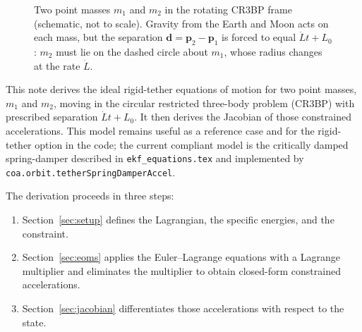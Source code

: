 \documentclass[]{article}
\begin{document}
\begin{figure}[htbp]
\caption{Two point masses $m_1$ and $m_2$ in the rotating CR3BP frame (schematic, not
to scale). Gravity from the Earth and Moon acts on each mass, but the separation
$\mathbf{d} = \mathbf{p}_2 - \mathbf{p}_1$ is forced to equal $\dot{L}t + L_0$: $m_2$ must lie on the dashed
circle about $m_1$, whose radius changes at the rate $\dot{L}$.}
\label{fig:setup}
\end{figure}

This note derives the ideal rigid-tether equations of motion for two point
masses, $m_1$ and $m_2$, moving in the circular restricted three-body problem
(CR3BP) with prescribed separation $\dot{L}t+L_0$. It then derives the
Jacobian of those constrained accelerations. This model remains useful as a
reference case and for the rigid-tether option in the code; the current
compliant model is the critically damped spring-damper described in
\texttt{ekf\_equations.tex} and implemented by
\texttt{coa.orbit.tetherSpringDamperAccel}.

The derivation proceeds in three steps:
\begin{enumerate}
    \item Section~\ref{sec:setup} defines the Lagrangian, the specific energies, and the constraint.
    \item Section~\ref{sec:eoms} applies the Euler--Lagrange equations with a Lagrange multiplier and eliminates the multiplier to obtain closed-form constrained accelerations.
    \item Section~\ref{sec:jacobian} differentiates those accelerations with respect to the state.
\end{enumerate}
\end{document}
